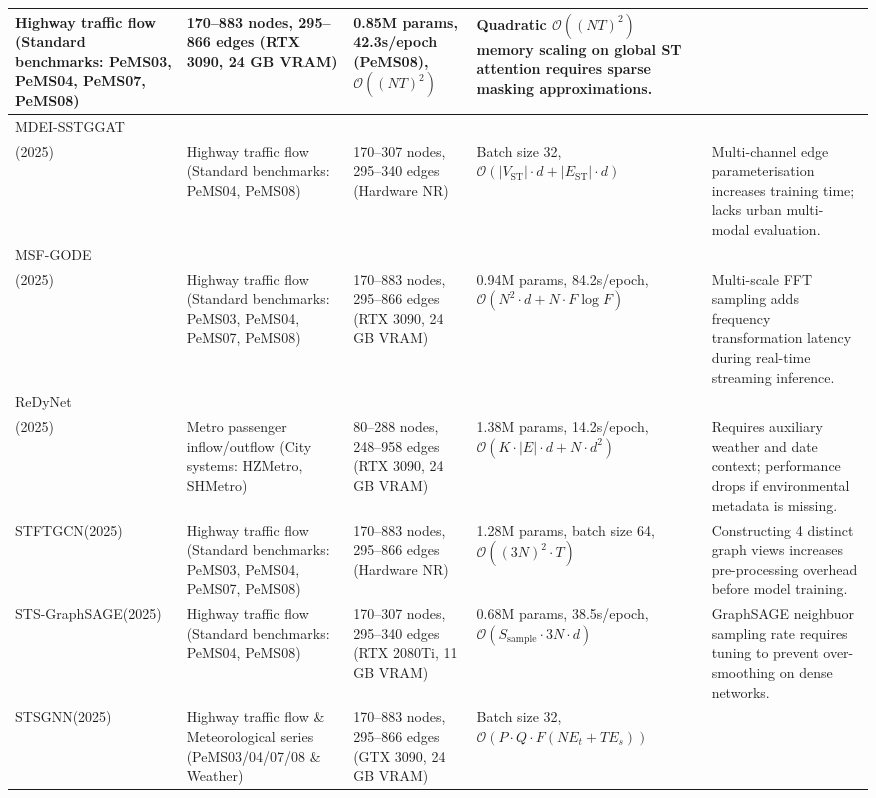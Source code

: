 \begin{longtable}{p{1.5cm} p{2.25cm} p{2.25cm} p{2.25cm} p{2.25cm}}
Highway traffic flow (Standard benchmarks: PeMS03, PeMS04, PeMS07, PeMS08) &
170--883 nodes, 295--866 edges (RTX 3090, 24 GB VRAM) &
0.85M params, 42.3s/epoch (PeMS08), $\mathcal{O}((NT)^2)$ &
Quadratic $\mathcal{O}((NT)^2)$ memory scaling on global ST attention requires sparse masking approximations. \\
\hline
\pagebreak[4]
MDEI-SSTGGAT\\(2025) ~\cite{zhang2025synchronous} &
Highway traffic flow (Standard benchmarks: PeMS04, PeMS08) &
170--307 nodes, 295--340 edges (Hardware NR) &
Batch size 32, $\mathcal{O}(|V_{\text{ST}}| \cdot d + |E_{\text{ST}}| \cdot d)$ &
Multi-channel edge parameterisation increases training time; lacks urban multi-modal evaluation. \\
\hline
MSF-GODE\\(2025) ~\cite{liu2025msf} &
Highway traffic flow (Standard benchmarks: PeMS03, PeMS04, PeMS07, PeMS08) &
170--883 nodes, 295--866 edges (RTX 3090, 24 GB VRAM) &
0.94M params, 84.2s/epoch, $\mathcal{O}(N^2 \cdot d + N \cdot F \log F)$ &
Multi-scale FFT sampling adds frequency transformation latency during real-time streaming inference. \\
\hline
ReDyNet\\(2025) ~\cite{gao2025responsive} &
Metro passenger inflow/outflow (City systems: HZMetro, SHMetro) &
80--288 nodes, 248--958 edges (RTX 3090, 24 GB VRAM) &
1.38M params, 14.2s/epoch, $\mathcal{O}(K \cdot |E| \cdot d + N \cdot d^2)$ &
Requires auxiliary weather and date context; performance drops if environmental metadata is missing. \\
\hline
STFTGCN(2025) ~\cite{zhang2025trend} &
Highway traffic flow (Standard benchmarks: PeMS03, PeMS04, PeMS07, PeMS08) &
170--883 nodes, 295--866 edges (Hardware NR) &
1.28M params, batch size 64, $\mathcal{O}((3N)^2 \cdot T)$ &
Constructing 4 distinct graph views increases pre-processing overhead before model training. \\
\hline
STS-GraphSAGE(2025) ~\cite{yu2025spatial} &
Highway traffic flow (Standard benchmarks: PeMS04, PeMS08) &
170--307 nodes, 295--340 edges (RTX 2080Ti, 11 GB VRAM) &
0.68M params, 38.5s/epoch, $\mathcal{O}(S_{\text{sample}} \cdot 3N \cdot d)$ &
GraphSAGE neighbuor sampling rate requires tuning to prevent over-smoothing on dense networks. \\
\hline
STSGNN(2025) ~\cite{chen2025designing} &
Highway traffic flow \& Meteorological series (PeMS03/04/07/08 \& Weather) &
170--883 nodes, 295--866 edges (GTX 3090, 24 GB VRAM) &
Batch size 32, $\mathcal{O}(P \cdot Q \cdot F (N E_t + T E_s))$ &

\end{longtable}
